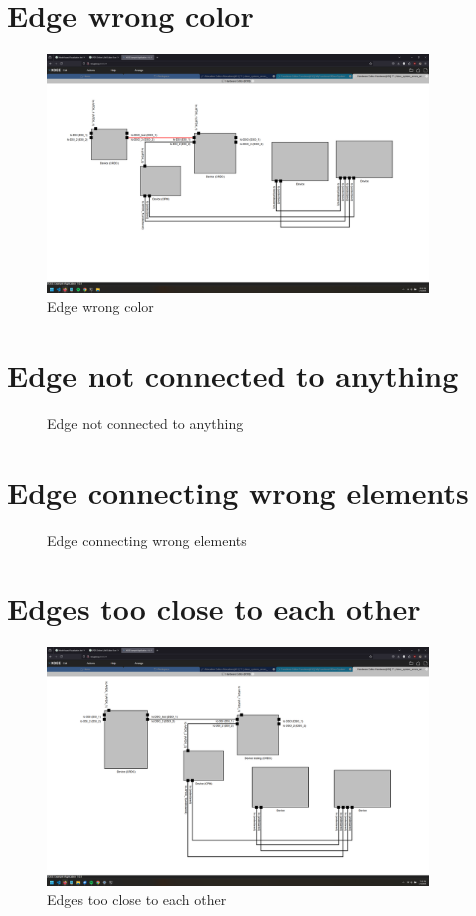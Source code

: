 \documentclass{article}
\begin{document}
\section{Edge wrong color}
\begin{figure}[H]
    \centering
    \includegraphics[width=0.9\textwidth]{images/edge_wrong_color.png}
    \caption{Edge wrong color}
\end{figure}
\newpage

\section{Edge not connected to anything}
\begin{figure}[H]
    \centering
    \caption{Edge not connected to anything}
\end{figure}
\newpage

\section{Edge connecting wrong elements}
\begin{figure}[H]
    \centering
    \caption{Edge connecting wrong elements}
\end{figure}
\newpage

\section{Edges too close to each other}
\begin{figure}[H]
    \centering
    \includegraphics[width=0.9\textwidth]{images/edges_too_close_to_each_other.png}
    \caption{Edges too close to each other}
\end{figure}
\newpage
\end{document}
